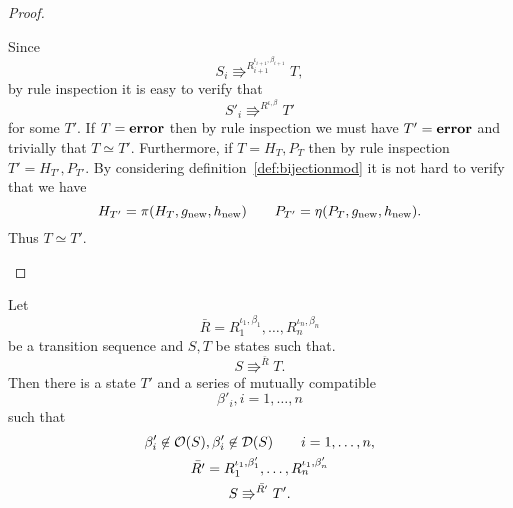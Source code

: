 \begin{proof}
\begin{description}
      Since
      \begin{equation}
        S_i \Rrightarrow^{R_{i+1}^{\iota_{i+1}, \beta_{i+1}}} T,
      \end{equation}
      by rule inspection it is easy to verify that
      \begin{equation}
        S'_i \Rrightarrow^{R^{\iota, \beta}} T'
      \end{equation}
      for some $T'$. If $T = \mbox{{\bf error}}$ then by rule inspection we must have $T' =
      \mbox{{\bf error}}$ and trivially that $T \simeq T'$. Furthermore, if $T = H_{T},
      P_{T}$ then by rule inspection $T' = H_{T'}, P_{T'}$. By considering
      definition~\ref{def:bijectionmod} it is not hard to verify that
      we have
      \begin{equation*}
        H_{T'} = \pi(H_T, g_{\text{new}}, h_{\text{new}}) \quad\quad P_{T'} =
        \eta(P_T, g_{\text{new}}, h_{\text{new}}).
      \end{equation*}
      Thus $T \simeq T'$.
  \end{description}
\end{proof}

\begin{lemma} \label{lem:lemma4}
  Let 
  \begin{equation*}
    \bar{R} = R_1^{\iota_1, \beta_1}, \dots, R_n^{\iota_n, \beta_n}
  \end{equation*}
  be a transition sequence and $S, T$ be states such that.
  \begin{equation*}
    S \Rrightarrow^{\bar{R}} T.
  \end{equation*}
  Then there is a state $T'$ and a series of mutually compatible 
  \begin{equation*}
    \beta'_i, i = 1, \dots, n
  \end{equation*}
  such that
  \begin{equation*}
    \begin{gathered}
      \beta'_i \not\in \mathcal{O}(S), \beta'_i \not\in \mathcal{D}(S) \quad\quad i =
      1, \dots, n, \\
      \bar{R'} = R_1^{\iota_1, \beta'_1}, \dots, R_n^{\iota_1, \beta'_n} \\
      S \Rrightarrow^{\bar{R'}} T'.
    \end{gathered}
  \end{equation*}
\end{lemma}

